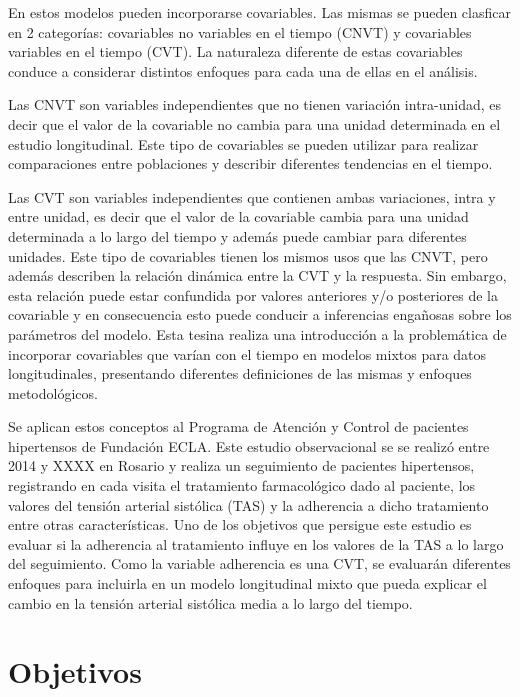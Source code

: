 \documentclass[spanish]{article}
\numberwithin{figure}{subsection}
\numberwithin{equation}{subsection}
\numberwithin{table}{subsection}
\begin{document}
En estos modelos pueden incorporarse covariables. Las mismas se pueden clasficar
en 2 categorías: covariables no variables en el tiempo (CNVT) y covariables
variables en el tiempo (CVT). La naturaleza diferente de estas covariables
conduce a considerar distintos enfoques para cada una de ellas en el análisis.

Las CNVT son variables independientes que no tienen variación intra-unidad, es
decir que el valor de la covariable no cambia para una unidad determinada en
el estudio longitudinal. Este tipo de covariables se pueden utilizar para
realizar comparaciones entre poblaciones y describir diferentes tendencias en el
tiempo.

Las CVT son variables independientes que contienen ambas variaciones, intra y
entre unidad, es decir que el valor de la covariable cambia para una unidad
determinada a lo largo del tiempo y además puede cambiar para diferentes
unidades. Este tipo de covariables tienen los mismos usos que las CNVT, pero
además describen la relación dinámica entre la CVT y la respuesta. Sin embargo,
esta relación puede estar confundida por valores anteriores y/o posteriores de
la covariable y en consecuencia esto puede conducir a inferencias engañosas
sobre los parámetros del modelo. Esta tesina realiza una introducción a la
problemática de incorporar covariables que varían con el tiempo en modelos
mixtos para datos longitudinales, presentando diferentes definiciones de las
mismas y enfoques metodológicos.

Se aplican estos conceptos al Programa de Atención y Control de pacientes
hipertensos de Fundación ECLA. Este estudio observacional se se realizó entre
2014 y XXXX en Rosario y realiza un seguimiento de pacientes hipertensos,
registrando en cada visita el tratamiento farmacológico dado al paciente, los
valores del tensión arterial sistólica (TAS) y la adherencia a dicho tratamiento
entre otras características. Uno de los objetivos que persigue este estudio es
evaluar si la adherencia al tratamiento influye en los valores de la TAS a lo
largo del seguimiento. Como la variable adherencia es una CVT, se evaluarán
diferentes enfoques para incluirla en un modelo longitudinal mixto que pueda
explicar el cambio en la tensión arterial sistólica media a lo largo del tiempo.

\newpage
\section{Objetivos}
\end{document}
